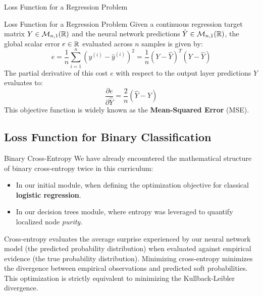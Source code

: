 \begin{frame}{Loss Function for a Regression Problem}
	\begin{block}{Loss Function for a Regression Problem}
		Given a continuous regression target matrix $Y \in \mathcal{M}_{n,1}(\mathbb{R})$ and the neural network predictions $\hat{Y} \in \mathcal{M}_{n,1}(\mathbb{R})$, the global scalar error $e \in \mathbb{R}$ evaluated across $n$ samples is given by:
		\begin{equation*}
			e = \frac{1}{n} \sum_{i=1}^n \left(y^{(i)} - \hat{y}^{(i)}\right)^2 = \frac{1}{n} \left(Y - \hat{Y}\right)^T \left(Y - \hat{Y}\right)
		\end{equation*}
		The partial derivative of this cost $e$ with respect to the output layer predictions $\hat{Y}$ evaluates to:
		\begin{equation*}
			\frac{\partial{e}}{\partial{\hat{Y}}} = \frac{2}{n} \left(\hat{Y} - Y\right)
		\end{equation*}
		This objective function is widely known as the \textbf{Mean-Squared Error} (MSE).
	\end{block}
\end{frame}

\subsection[Loss Function for Binary Classification]{Loss Function for Binary Classification}

\begin{frame}{Binary Cross-Entropy}
	We have already encountered the mathematical structure of binary cross-entropy twice in this curriculum:
	\begin{itemize}
		\item In our initial module, when defining the optimization objective for classical \textbf{logistic regression}.
		\item In our decision trees module, where entropy was leveraged to quantify localized node \textit{purity}.
	\end{itemize}
	\pause
	Cross-entropy evaluates the average surprise experienced by our neural network model (the predicted probability distribution) when evaluated against empirical evidence (the true probability distribution). Minimizing cross-entropy minimizes the divergence between empirical observations and predicted soft probabilities. This optimization is strictly equivalent to minimizing the Kullback-Leibler divergence.
\end{frame}

